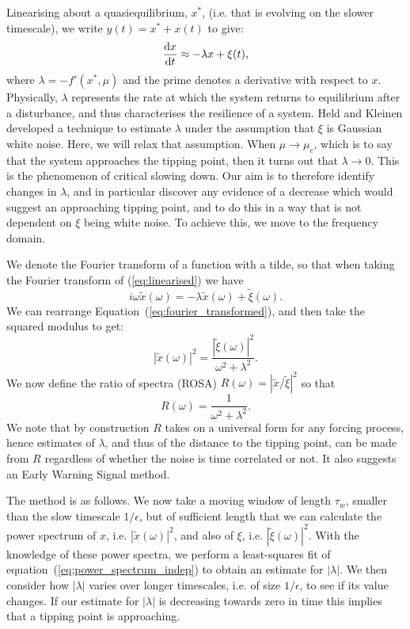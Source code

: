 Linearising about a quasiequilibrium, $x^*$, (i.e. that is evolving on the slower timescale), we write
$y(t) = x^* + x(t)$ to give:
\begin{equation}
  \label{eq:linearised}
  \dv{x}{t} \approx -\lambda x + \xi(t),
\end{equation}
where $\lambda = -f'(x^*,\mu)$ and the prime denotes a derivative with respect to $x$. 
Physically, $\lambda$ represents the rate at which the system returns to equilibrium after
a disturbance, and thus characterises the resilience of a system. Held and Kleinen\cite{Held2004} developed a technique to estimate $\lambda$
under the assumption that $\xi$ is Gaussian white noise. Here, we will
relax that assumption.
When $\mu \rightarrow \mu_c$, which is to say that the system approaches
the tipping point, then it turns out that $\lambda \rightarrow 0$\cite{guckenheimer2013}. This is the phenomenon of critical slowing down. Our aim is to therefore
identify changes in $\lambda$, and in particular discover any evidence of a decrease which would suggest an approaching tipping point, and
to do this in a way that is not dependent on $\xi$ being white noise. To achieve this, we move to the frequency domain.

We denote the Fourier transform of a function with a tilde, so that when taking the Fourier transform of (\cref{eq:linearised}) we have
\begin{equation}
  \label{eq:fourier_transformed}
  i\omega \tilde{x}(\omega) = -\lambda \tilde{x}(\omega) + \tilde{\xi}(\omega).
\end{equation}
We can rearrange Equation~(\cref{eq:fourier_transformed}), and then take the squared modulus to get:
\begin{equation}
  \label{eq:power_spectra}
  |\tilde{x}(\omega)|^2 = \frac{|\tilde{\xi}(\omega)|^2}{\omega^2 + \lambda^2}.
\end{equation}
We now define the ratio of spectra (ROSA)
$R(\omega) = |\tilde{x}/\tilde{\xi}|^2$ so that
\begin{equation}
    \label{eq:power_spectrum_indep}
    R(\omega) = \frac{1}{\omega^2 + \lambda^2}.
\end{equation}
We note that by construction $R$ takes on a universal form for any 
forcing process,
hence estimates of $\lambda$, and thus of the 
distance to the tipping point, can be made from $R$ regardless 
of whether the noise is time correlated or not. It also suggests an
Early Warning Signal method.

The method is as follows.
We now take a moving window of length $\tau_w$, smaller than the slow timescale $1/\epsilon$, but of sufficient
length that we can calculate the power spectrum of $x$, i.e. $|\tilde{x}(\omega)|^2$, and also of
$\xi$, i.e. $|\tilde{\xi}(\omega)|^2$. With the knowledge of these power spectra, we perform a least-squares fit of equation~(\cref{eq:power_spectrum_indep}) to obtain an estimate for $|\lambda|$.  We then consider how $|\lambda|$ varies over longer timescales, i.e. of
size $1/\epsilon$, to see if its value changes. 
If our estimate for $|\lambda|$ is decreasing towards zero in time this implies that a tipping point is approaching. 

